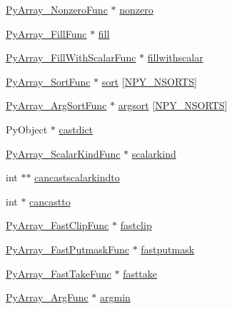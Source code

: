 \begin{DoxyCompactItemize}
\item 
\hyperlink{ndarraytypes_8h_a38a53f5f5ea4643a52a4449dcc98e1e5}{Py\+Array\+\_\+\+Nonzero\+Func} $\ast$ \hyperlink{structPyArray__ArrFuncs_af42049a2dd0ce775321d39882a532d01}{nonzero}
\item 
\hyperlink{ndarraytypes_8h_af99fb6bddb77f2ca46afe994ff57bcd6}{Py\+Array\+\_\+\+Fill\+Func} $\ast$ \hyperlink{structPyArray__ArrFuncs_a378cac130d297ec843ec9e4a1bcd2d3f}{fill}
\item 
\hyperlink{ndarraytypes_8h_a87eb7e6248822735f511bfd17147786c}{Py\+Array\+\_\+\+Fill\+With\+Scalar\+Func} $\ast$ \hyperlink{structPyArray__ArrFuncs_a3ecf0e3e05c40ae8649a006416b1fa66}{fillwithscalar}
\item 
\hyperlink{ndarraytypes_8h_ab1ed2c7a81f08167bf2ca8c544434944}{Py\+Array\+\_\+\+Sort\+Func} $\ast$ \hyperlink{structPyArray__ArrFuncs_ad13669f3742b69d65e767574ac434986}{sort} \mbox{[}\hyperlink{ndarraytypes_8h_a0267c2e5d8df5971c9b54b6231bca60b}{N\+P\+Y\+\_\+\+N\+S\+O\+R\+TS}\mbox{]}
\item 
\hyperlink{ndarraytypes_8h_a01fe4c503a50330754b163c5853a8b70}{Py\+Array\+\_\+\+Arg\+Sort\+Func} $\ast$ \hyperlink{structPyArray__ArrFuncs_acbbaca84f9d091305fffae87115499e5}{argsort} \mbox{[}\hyperlink{ndarraytypes_8h_a0267c2e5d8df5971c9b54b6231bca60b}{N\+P\+Y\+\_\+\+N\+S\+O\+R\+TS}\mbox{]}
\item 
Py\+Object $\ast$ \hyperlink{structPyArray__ArrFuncs_af83938dc15ecf71989ab32545bb8f5bb}{castdict}
\item 
\hyperlink{ndarraytypes_8h_acb1e2520f547b45ae355b2515876cf96}{Py\+Array\+\_\+\+Scalar\+Kind\+Func} $\ast$ \hyperlink{structPyArray__ArrFuncs_a29af71d75758fac115ec942bb3d949f1}{scalarkind}
\item 
int $\ast$$\ast$ \hyperlink{structPyArray__ArrFuncs_afdc3d3eca1fb76f99a77c1ca11db20d6}{cancastscalarkindto}
\item 
int $\ast$ \hyperlink{structPyArray__ArrFuncs_ab38e491b7d89a1063bd7a152b0f82e38}{cancastto}
\item 
\hyperlink{ndarraytypes_8h_ad69c092f1bf95998fb91f33d882cc6a0}{Py\+Array\+\_\+\+Fast\+Clip\+Func} $\ast$ \hyperlink{structPyArray__ArrFuncs_a17d3a6daeb21211d58e4fbf4388853f7}{fastclip}
\item 
\hyperlink{ndarraytypes_8h_a4c470a4911b788ebad0e6fa8448894e1}{Py\+Array\+\_\+\+Fast\+Putmask\+Func} $\ast$ \hyperlink{structPyArray__ArrFuncs_a87cec546abc760bc5910561f23961977}{fastputmask}
\item 
\hyperlink{ndarraytypes_8h_adf9f91ec2f8802986ad0b94231fa2c77}{Py\+Array\+\_\+\+Fast\+Take\+Func} $\ast$ \hyperlink{structPyArray__ArrFuncs_af722a2fd4374634418a8fa26b25922b7}{fasttake}
\item 
\hyperlink{ndarraytypes_8h_a257e44e2b89a2689ac102ea7fa6e9a52}{Py\+Array\+\_\+\+Arg\+Func} $\ast$ \hyperlink{structPyArray__ArrFuncs_ac4f0598d0d9ed068c8a0423325de2e74}{argmin}
\end{DoxyCompactItemize}


